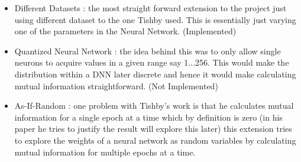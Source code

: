 \begin{itemize}
\begin{item}
      \begin{itemize}
        \item{
            Different Datasets : the most straight forward extension to the
            project just using different dataset to the one Tishby used. This is
            essentially just varying one of the parameters in the Neural
            Network. (Implemented)
          }
        \item{
            Quantized Neural Network : the idea behind this was to only allow
            single neurons to acquire values in a given range say 1...256. This
            would make the distribution within a DNN later discrete and hence it
            would make calculating mutual information straightforward. (Not
            Implemented)
          }
        \item{
            As-If-Random : one problem with Tishby's work is that he calculates
            mutual information for a single epoch at a time which by definition
            is zero (in his paper he tries to justify the result will explore
            this later) this extension tries to explore the weights of a neural
            network as random variables by calculating mutual information for
            multiple epochs at a time.
          }
      \end{itemize}
    \end{item}
\end{itemize}



